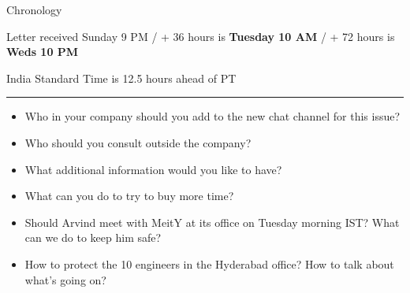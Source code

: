 \documentclass[nobackground,dvipsnames,table]{beamer}
\begin{document}
\begin{frame}{Chronology}

Letter received Sunday 9 PM / + 36 hours is \textbf{Tuesday 10 AM} / + 72 hours is \textbf{Weds 10 PM}\newline

India Standard Time is 12.5 hours ahead of PT

\begin{center}
    \rule{8cm}{0.4pt}    
\end{center}

\small{
\begin{itemize}
    \item Who in your company should you add to the new chat channel for this issue?
    \item Who should you consult outside the company?
    \item What additional information would you like to have?
    \item What can you do to try to buy more time?
    \item Should Arvind meet with MeitY at its office on Tuesday morning IST? What can we do to keep him safe?
    \item How to protect the 10 engineers in the Hyderabad office? How to talk about what’s going on?
\end{itemize}
}

\end{frame}
\end{document}
